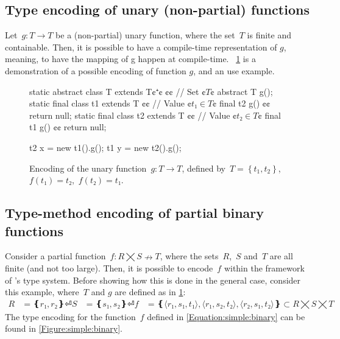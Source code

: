 \subsection{Type encoding of unary (non-partial) functions}
Let~$g: T \rightarrow T $ be a (non-partial) unary function,
  where the set~$T$ is finite and containable.
Then, it is possible to have a compile-time representation of $g$,
  meaning, to have the mapping of g happen at compile-time.
~\cref{Figure:unary:function} is a demonstration of a possible encoding
of function $g$, and an use example.  
\begin{figure}
  \begin{JAVA}[style=numbered]
static abstract class T extends T¢$⁺$¢ {¢¢ // Set ¢$T$¢
  abstract T g();
}
static final class t1 extends T {¢¢ // Value ¢$t₁∈T$¢
  final t2 g() {¢¢ return null; }
}
static final class t2 extends T {¢¢ // Value ¢$t₂∈T$¢
  final t1 g() {¢¢ return null; }
}

  t2 x = new t1().g();
  t1 y = new t2().g();
\end{JAVA}
  \caption{Encoding of the unary function~$g: T→T$,
  defined by~$T=\left\{ t_1,t_2 \right\}$,~$f(t₁)=t₂$,~$f(t₂)=t₁$.}
  \label{Figure:unary:function}
\end{figure}

\subsection{Type-method encoding of partial binary functions}
Consider a partial function~$f: R⨉S↛T$,
  where the sets~$R$,~$S$ and~$T$ are all finite (and not too large).
Then, it is possible to encode~$f$ within the framework of \Java's type system.
Before showing how this is done in the general case, consider this example, 
where~$T$ and $g$ are defined as in \cref{Figure:unary:function}:
\begin{equation}
  \label{Equation:simple:binary}
\begin{split}
  R & = ❴ r₁, r₂❵⏎
  S & = ❴ s₁, s₂❵⏎
  f & = ❴ ⟨r₁, s₁, t₁⟩, ⟨r₁, s₂, t₂⟩, ⟨r₂, s₁, t₂⟩ ❵ ⊂R⨉S⨉T
\end{split}
\end{equation}
The \Java type encoding for the function~$f$ defined in \cref{Equation:simple:binary}
  can be found in \cref{Figure:simple:binary}.

